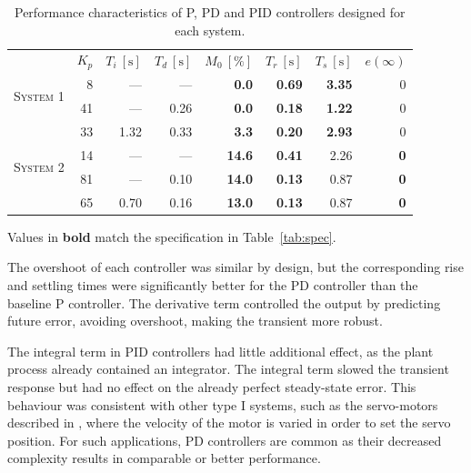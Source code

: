 \documentclass[a4paper,10pt,twocolumn]{article}
\begin{document}
\begin{table}[h!]
	\centering
	\footnotesize
	\begin{threeparttable}
		\caption{Performance characteristics of P, PD and PID controllers designed for each system.}
		\label{tab:pid}
		\setlength{\tabcolsep}{3pt}
		\begin{tabular}{@{}crrrrrrr@{}}
			\toprule
			&
				$K_p$ &
				$T_i~[\si{\second}]$ &
				$T_d~[\si{\second}]$ &
				$M_0~[\%]$ &
				$T_r~[\si{\second}]$ &
				$T_s~[\si{\second}]$ &
				$e(\infty)$ \\
			\cmidrule(r){2-4}\cmidrule(l){5-8}
			\multirow{2}{*}{
				\begin{sideways}\tiny
					\textsc{System 1}
				\end{sideways}
			}
			& 8 & --- & --- & 
				\textbf{0.0} & \textbf{0.69} & \textbf{3.35}  & 0 \\
			& 41 & --- & 0.26 &
				\textbf{0.0} & \textbf{0.18} & \textbf{1.22} & 0 \\
			& 33 & 1.32 & 0.33 &
				\textbf{3.3} & \textbf{0.20} & \textbf{2.93} & 0 \\
			\cmidrule{2-8}
			\multirow{2}{*}{
				\begin{sideways}\tiny
					\textsc{System 2}
				\end{sideways}
			}
			& 14 & --- & --- &
				\textbf{14.6} & \textbf{0.41} & 2.26 & \textbf{0} \\
			& 81 & --- & 0.10 &
				\textbf{14.0} & \textbf{0.13} & 0.87 & \textbf{0} \\
			& 65 & 0.70 & 0.16 &
				\textbf{13.0} & \textbf{0.13} & 0.87 & \textbf{0} \\
			\bottomrule
		\end{tabular}
		\begin{tablenotes}
			\item Values in \textbf{bold} match the specification in Table~\ref{tab:spec}.
		\end{tablenotes}
	\end{threeparttable}
\end{table}

The overshoot of each controller was similar by design, but the corresponding rise and settling times were significantly better for the PD controller than the baseline P controller. 
The derivative term controlled the output by predicting future error, avoiding overshoot, making the transient more robust.

The integral term in PID controllers had little additional effect, as the plant process already contained an integrator. The integral term slowed the transient response but had no effect on the already perfect steady-state error. This behaviour was consistent with other type I systems, such as the servo-motors described in \cite[pp.~235--236]{dorf2010modern}, where the velocity of the motor is varied in order to set the servo position. For such applications, PD controllers are common as their decreased complexity results in comparable or better performance.
\end{document}
